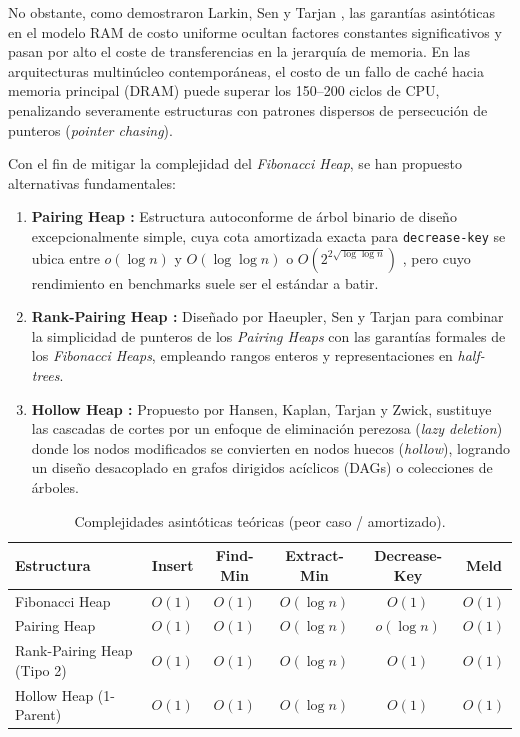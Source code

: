 \documentclass[11pt,a4paper]{article}
\begin{document}
No obstante, como demostraron Larkin, Sen y Tarjan \cite{larkin2014back}, las garantías asintóticas en el modelo RAM de costo uniforme ocultan factores constantes significativos y pasan por alto el coste de transferencias en la jerarquía de memoria. En las arquitecturas multinúcleo contemporáneas, el costo de un fallo de caché hacia memoria principal (DRAM) puede superar los 150--200 ciclos de CPU, penalizando severamente estructuras con patrones dispersos de persecución de punteros (\textit{pointer chasing}).

Con el fin de mitigar la complejidad del \textit{Fibonacci Heap}, se han propuesto alternativas fundamentales:
\begin{enumerate}
    \item \textbf{Pairing Heap \cite{fredman1986pairing}:} Estructura autoconforme de árbol binario de diseño excepcionalmente simple, cuya cota amortizada exacta para \texttt{decrease-key} se ubica entre $o(\log n)$ y $O(\log \log n)$ o $O(2^{2\sqrt{\log \log n}})$ \cite{pettie2005towards}, pero cuyo rendimiento en benchmarks suele ser el estándar a batir.
    \item \textbf{Rank-Pairing Heap \cite{haeupler2011rank}:} Diseñado por Haeupler, Sen y Tarjan para combinar la simplicidad de punteros de los \textit{Pairing Heaps} con las garantías formales de los \textit{Fibonacci Heaps}, empleando rangos enteros y representaciones en \textit{half-trees}.
    \item \textbf{Hollow Heap \cite{hansen2017hollow}:} Propuesto por Hansen, Kaplan, Tarjan y Zwick, sustituye las cascadas de cortes por un enfoque de eliminación perezosa (\textit{lazy deletion}) donde los nodos modificados se convierten en nodos huecos (\textit{hollow}), logrando un diseño desacoplado en grafos dirigidos acíclicos (DAGs) o colecciones de árboles.
\end{enumerate}

\begin{table}[h!]
\centering
\small
\caption{Complejidades asintóticas teóricas (peor caso / amortizado).}
\label{tab:teoria}
\begin{tabular}{lccccc}
\toprule
\textbf{Estructura} & \textbf{Insert} & \textbf{Find-Min} & \textbf{Extract-Min} & \textbf{Decrease-Key} & \textbf{Meld} \\
\midrule
Fibonacci Heap & $O(1)$ & $O(1)$ & $O(\log n)$ & $O(1)$ & $O(1)$ \\
Pairing Heap & $O(1)$ & $O(1)$ & $O(\log n)$ & $o(\log n)$ & $O(1)$ \\
Rank-Pairing Heap (Tipo 2) & $O(1)$ & $O(1)$ & $O(\log n)$ & $O(1)$ & $O(1)$ \\
Hollow Heap (1-Parent) & $O(1)$ & $O(1)$ & $O(\log n)$ & $O(1)$ & $O(1)$ \\
\bottomrule
\end{tabular}
\end{table}
\end{document}
